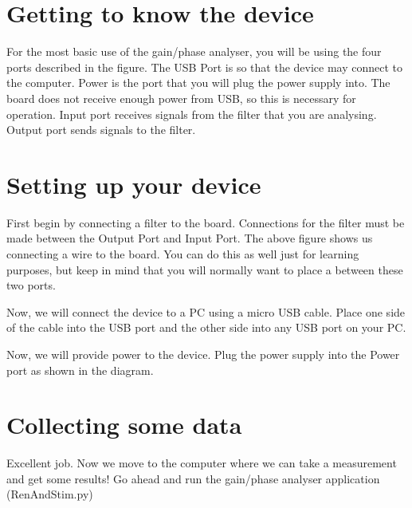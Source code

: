 \begin{multicols}{2}
\section{Getting to know the device}

For the most basic use of the gain/phase analyser, you will be using the four ports described in the figure.
The USB Port is so that the device may connect to the computer.
Power is the port that you will plug the power supply into.  The board does not receive enough power from USB, so this is necessary for operation.
Input port receives signals from the filter that you are analysing.
Output port sends signals to the filter.


\section{Setting up your device}
\end{multicols}
\begin{center}
\end{center}
\begin{multicols}{2}

First begin by connecting a filter to the board.  Connections for the filter must be made between the Output Port and Input Port.  The above figure shows us connecting a wire to the board.  You can do this as well just for learning purposes, but keep in mind that you will normally want to place a between these two ports.

\end{multicols}
\begin{center}
\end{center}
\begin{multicols}{2}

Now, we will connect the device to a PC using a micro USB cable.  Place one side of the cable into the USB port and the other side into any USB port on your PC.

\end{multicols}
\begin{center}
\end{center}
\begin{multicols}{2}

Now, we will provide power to the device.  Plug the power supply into the Power port as shown in the diagram.

\section{Collecting some data}

Excellent job.  Now we move to the computer where we can take a measurement and get some results!  
Go ahead and run the gain/phase analyser application (RenAndStim.py)

\end{multicols}
